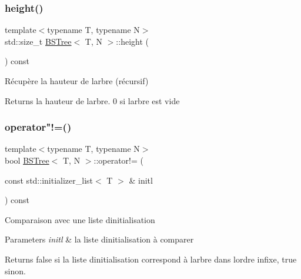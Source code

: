 \subsubsection{\texorpdfstring{height()}{height()}}
{\footnotesize\ttfamily template$<$typename T, typename N$>$ \\
std\+::size\+\_\+t \hyperlink{classBSTree}{B\+S\+Tree}$<$ T, N $>$\+::height (\begin{DoxyParamCaption}{ }\end{DoxyParamCaption}) const\hspace{0.3cm}{\ttfamily [inline]}}

Récupère la hauteur de l\textquotesingle{}arbre (récursif)

\begin{DoxyReturn}{Returns}
la hauteur de l\textquotesingle{}arbre. 0 si l\textquotesingle{}arbre est vide 
\end{DoxyReturn}
\mbox{\label{classBSTree_aae9d32f9035b1d0aa35a39bf9f196399}} 
\subsubsection{\texorpdfstring{operator"!=()}{operator!=()}}
{\footnotesize\ttfamily template$<$typename T, typename N$>$ \\
bool \hyperlink{classBSTree}{B\+S\+Tree}$<$ T, N $>$\+::operator!= (\begin{DoxyParamCaption}\item[{const std\+::initializer\+\_\+list$<$ T $>$ \&}]{initl }\end{DoxyParamCaption}) const\hspace{0.3cm}{\ttfamily [inline]}}

Comparaison avec une liste d\textquotesingle{}initialisation


\begin{DoxyParams}{Parameters}
{\em initl} & la liste d\textquotesingle{}initialisation à comparer\\
\hline
\end{DoxyParams}
\begin{DoxyReturn}{Returns}
false si la liste d\textquotesingle{}initialisation correspond à l\textquotesingle{}arbre dans l\textquotesingle{}ordre infixe, true sinon. 
\end{DoxyReturn}
\mbox{\label{classBSTree_a079e116466f53f9716387b5ac494f35e}} 
